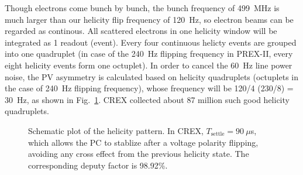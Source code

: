 Though electrons come bunch by bunch, the bunch frequency of 499~MHz is much
larger than our helicity flip frequency of 120~Hz, so electron beams can be regarded
as continous. All scattered electrons in one helicity window will be integrated as 1
readout (event). Every four continuous helicty events are grouped into one quadruplet
(in case of the 240~Hz flipping frequency in PREX-II, every eight helicity events 
form one octuplet).
In order to cancel the 60~Hz line power noise, the PV asymmetry is
calculated based on helicity quadruplets (octuplets in the case of 240~Hz flipping frequency), 
whose frequency will be 120/4 (230/8) = 30~Hz, as shown in Fig.~\ref{fig:helicity_pattern}. 
CREX collected about 87 million such good helicity quadruplets.
\begin{figure}[!h]
    \centering
    \caption{Schematic plot of the helicity pattern. In CREX, $T_{\text{settle}} = 90\ \mu$s, 
    which allows the PC to stablize after a voltage polarity flipping, avoiding 
    any cross effect from the previous helicity state. The corresponding deputy factor 
    is 98.92\%.}
    \label{fig:helicity_pattern}
\end{figure}


